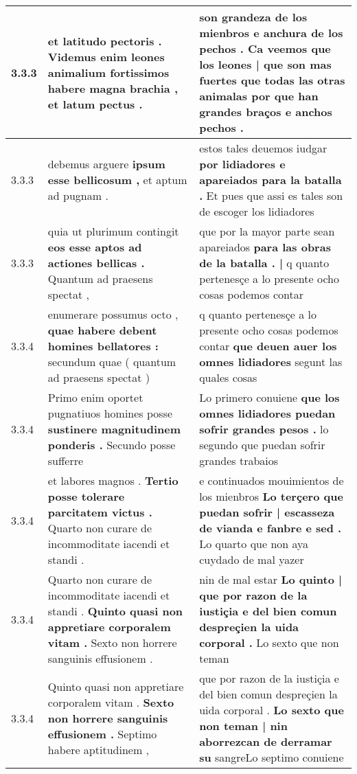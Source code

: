 \begin{tabular}{|p{1cm}|p{6.5cm}|p{6.5cm}|}
3.3.3 & et latitudo pectoris . \textbf{ Videmus enim leones animalium fortissimos habere magna brachia , } et latum pectus . & son grandeza de los mienbros e anchura de los pechos . \textbf{ Ca veemos que los leones | que son mas fuertes que todas las otras animalas } por que han grandes braços e anchos pechos . \\\hline
3.3.3 & debemus arguere \textbf{ ipsum esse bellicosum , } et aptum ad pugnam . & estos tales deuemos iudgar \textbf{ por lidiadores e apareiados para la batalla . } Et pues que assi es tales son de escoger los lidiadores \\\hline
3.3.3 & quia ut plurimum contingit \textbf{ eos esse aptos ad actiones bellicas . } Quantum ad praesens spectat , & que por la mayor parte sean apareiados \textbf{ para las obras de la batalla . |  } q quanto pertenesçe a lo presente ocho cosas podemos contar \\\hline
3.3.4 & enumerare possumus octo , \textbf{ quae habere debent homines bellatores : } secundum quae ( quantum ad praesens spectat ) & q quanto pertenesçe a lo presente ocho cosas podemos contar \textbf{ que deuen auer los omnes lidiadores } segunt las quales cosas \\\hline
3.3.4 & Primo enim oportet pugnatiuos homines posse \textbf{ sustinere magnitudinem ponderis . } Secundo posse sufferre & Lo primero conuiene \textbf{ que los omnes lidiadores puedan sofrir grandes pesos . } lo segundo que puedan sofrir grandes trabaios \\\hline
3.3.4 & et labores magnos . \textbf{ Tertio posse tolerare parcitatem victus . } Quarto non curare de incommoditate iacendi et standi . & e continuados mouimientos de los mienbros \textbf{ Lo terçero que puedan sofrir | escasseza de vianda e fanbre e sed . } Lo quarto que non aya cuydado de mal yazer \\\hline
3.3.4 & Quarto non curare de incommoditate iacendi et standi . \textbf{ Quinto quasi non appretiare corporalem vitam . } Sexto non horrere sanguinis effusionem . & nin de mal estar \textbf{ Lo quinto | que por razon de la iustiçia e del bien comun despreçien la uida corporal . } Lo sexto que non teman \\\hline
3.3.4 & Quinto quasi non appretiare corporalem vitam . \textbf{ Sexto non horrere sanguinis effusionem . } Septimo habere aptitudinem , & que por razon de la iustiçia e del bien comun despreçien la uida corporal . \textbf{ Lo sexto que non teman | nin aborrezcan de derramar su } sangreLo septimo conuiene \\\hline

\end{tabular}
